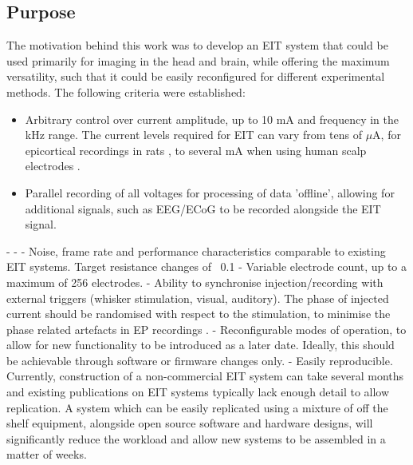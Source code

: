 \subsection{Purpose}

The motivation behind this work was to develop an EIT system that could be used primarily for imaging in the head and brain, while offering the maximum versatility, such that it could be easily reconfigured for different experimental methods. The following criteria were established:


\begin{itemize}
\item Arbitrary control over current amplitude, up to 10 mA and frequency in the kHz range. The current levels required for EIT can vary from tens of $\mu$A, for epicortical recordings in rats \cite{Oh2011}, to several mA when using human scalp electrodes \cite{tidswell2001three}.
\item Parallel recording of all voltages for processing of data 'offline', allowing for additional signals, such as EEG/ECoG to be recorded alongside the EIT signal.
\end{itemize}


- 
- 
- Noise, frame rate and performance characteristics comparable to existing EIT systems. Target resistance changes of ~0.1%
- Variable electrode count, up to a maximum of 256 electrodes.
- Ability to synchronise injection/recording with external triggers (whisker stimulation, visual, auditory). The phase of injected current should be randomised with respect to the stimulation, to minimise the phase related artefacts in EP recordings \cite{Aristovich_2015}.
- Reconfigurable modes of operation, to allow for new functionality to be introduced as a later date. Ideally, this should be achievable  through software or firmware changes only.
- Easily reproducible. Currently, construction of a non-commercial EIT system can take several months and existing publications on EIT systems typically lack enough detail to allow replication. A system which can be easily replicated using a mixture of off the shelf equipment, alongside open source software and hardware designs, will significantly reduce the workload and allow new systems to be assembled in a matter of weeks.